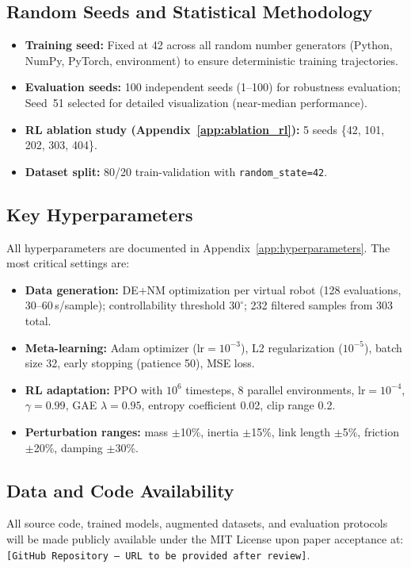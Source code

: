 \documentclass[DTMColor]{ROB-New}
\begin{document}
\subsection{Random Seeds and Statistical Methodology}
\begin{itemize}[leftmargin=*, itemsep=2pt]
    \item \textbf{Training seed:} Fixed at 42 across all random number generators (Python, NumPy, PyTorch, environment) to ensure deterministic training trajectories.
    \item \textbf{Evaluation seeds:} 100 independent seeds (1--100) for robustness evaluation; Seed~51 selected for detailed visualization (near-median performance).
    \item \textbf{RL ablation study (Appendix~\ref{app:ablation_rl}):} 5 seeds \{42, 101, 202, 303, 404\}.
    \item \textbf{Dataset split:} 80/20 train-validation with \texttt{random\_state=42}.
\end{itemize}

\subsection{Key Hyperparameters}
All hyperparameters are documented in Appendix~\ref{app:hyperparameters}. The most critical settings are:
\begin{itemize}[leftmargin=*, itemsep=2pt]
    \item \textbf{Data generation:} DE+NM optimization per virtual robot (128 evaluations, 30--60\,s/sample); controllability threshold $30^\circ$; 232 filtered samples from 303 total.
    \item \textbf{Meta-learning:} Adam optimizer ($\text{lr}=10^{-3}$), L2 regularization ($10^{-5}$), batch size 32, early stopping (patience 50), MSE loss.
    \item \textbf{RL adaptation:} PPO with $10^6$ timesteps, 8 parallel environments, $\text{lr}=10^{-4}$, $\gamma=0.99$, GAE $\lambda=0.95$, entropy coefficient 0.02, clip range 0.2.
    \item \textbf{Perturbation ranges:} mass $\pm$10\%, inertia $\pm$15\%, link length $\pm$5\%, friction $\pm$20\%, damping $\pm$30\%.
\end{itemize}

\subsection{Data and Code Availability}
All source code, trained models, augmented datasets, and evaluation protocols will be made publicly available under the MIT License upon paper acceptance at: \texttt{[GitHub Repository -- URL to be provided after review]}.
\end{document}
